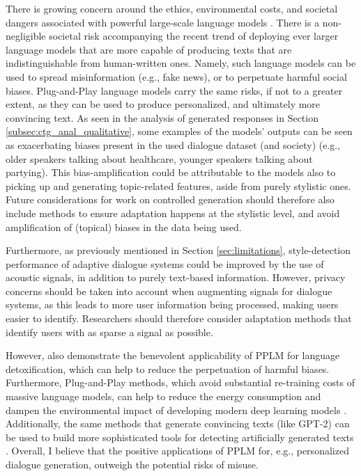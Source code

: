 There is growing concern around the ethics, environmental costs, and societal dangers associated with powerful large-scale language models \citep{brown2020language-models-few-shot-gpt3, bender2021dangers}. 
There is a non-negligible societal risk accompanying the recent trend of deploying ever larger language models that are more capable of producing texts that are indistinguishable from human-written ones. 
Namely, such language models can be used to spread misinformation (e.g., fake news), or to perpetuate harmful social biases.
Plug-and-Play language models carry the same risks, if not to a greater extent, as they can be used to produce personalized, and ultimately more convincing text.
As seen in the analysis of generated responses in Section \ref{subsec:ctg_anal_qualitative}, some examples of the models' outputs can be seen as exacerbating biases present in the used dialogue dataset (and society) (e.g., older speakers talking about healthcare, younger speakers talking about partying). This bias-amplification could be attributable to the models also to picking up and generating topic-related features, aside from purely stylistic ones. Future considerations for work on controlled generation should therefore also include methods to ensure adaptation happens at the stylistic level, and avoid amplification of (topical) biases in the data being used.

Furthermore, as previously mentioned in Section \ref{sec:limitations}, style-detection performance of adaptive dialogue systems could be improved by the use of acoustic signals, in addition to purely text-based information. However, privacy concerns should be taken into account when augmenting signals for dialogue systems, as this leads to more user information being processed, making users easier to identify. Researchers should therefore consider adaptation methods that identify users with as sparse a signal as possible.

However, \cite{dathathri2019plug} also demonstrate the benevolent applicability of PPLM for language detoxification, which can help to reduce the perpetuation of harmful biases.
Furthermore, Plug-and-Play methods, which avoid substantial re-training costs of massive language models, can help to reduce the energy consumption and dampen the environmental impact of developing modern deep learning models \citep{strubell-etal-2019-energy}.
Additionally, the same methods that generate convincing texts (like GPT-2) can be used to build more sophisticated tools for detecting artificially generated texts \cite{gehrmann-etal-2019-gltr}. 
Overall, I believe that the positive applications of PPLM for, e.g., personalized dialogue generation, outweigh the potential risks of misuse. 

